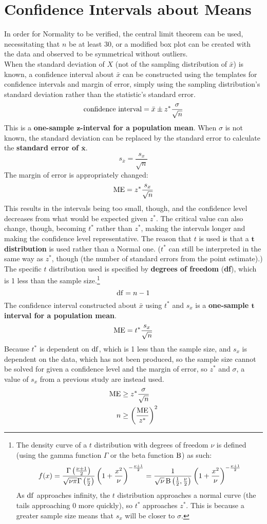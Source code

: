 \documentclass[../AP_Statistics.tex]{subfiles}
\begin{document}
		\section{Confidence Intervals about Means}
			In order for Normality to be verified, the central limit theorem can be used, necessitating that $n$ be at least 30, or a modified box plot can be created with the data and observed to be symmetrical without outliers. \\
			When the standard deviation of $X$ (not of the sampling distribution of $\bar{x}$) is known, a confidence interval about $\bar{x}$ can be constructed using the templates for confidence intervals and margin of error, simply using the sampling distribution's standard deviation rather than the statistic's standard error.
			\[\text{confidence interval} = \bar{x} \pm z^*\frac{\sigma}{\sqrt{n}}\]
			This is a \textbf{one-sample $\bm{z}$-interval for a population mean}.
			When $\sigma$ is not known, the standard deviation can be replaced by the standard error to calculate the \textbf{standard error of $\bm{\bar{x}}$}.
			\[s_{\bar{x}} = \frac{s_x}{\sqrt{n}}\]
			The margin of error is appropriately changed:
			\[\operatorname{ME} = z^*\frac{s_x}{\sqrt{n}}\]
			This results in the intervals being too small, though, and the confidence level decreases from what would be expected given $z^*$. The critical value can also change, though, becoming $t^*$ rather than $z^*$, making the intervals longer and making the confidence level representative. The reason that $t$ is used is that a $\bm{t}$\textbf{ distribution} is used rather than a Normal one. ($t^*$ can still be interpreted in the same way as $z^*$, though (the number of standard errors from the point estimate).) \\
			The specific $t$ distribution used is specified by \textbf{degrees of freedom} (\textbf{df}), which  is 1 less than the sample size.\footnote{The density curve of a $t$ distribution with degrees of freedom $\nu$ is defined (using the gamma function $\Gamma$ or the beta function $\operatorname{\mathrm{B}}$) as such:\[f(x) = \frac{\Gamma\left(\frac{\nu + 1}{2}\right)}{\sqrt{\nu\pi}\Gamma\left(\frac{\nu}{2}\right)}\left(1 + \frac{x^2}{\nu}\right)^{-\frac{\nu + 1}{2}} = \frac{1}{\sqrt{\nu}\operatorname{\mathrm{B}}\left(\frac{1}{2},\frac{\nu}{2}\right)}\left(1 + \frac{x^2}{\nu}\right)^{-\frac{\nu + 1}{2}}\]As $\operatorname{\mathrm{df}}$ approaches infinity, the $t$ distribution approaches a normal curve (the tails approaching 0 more quickly), so $t^*$ approaches $z^*$. This is because a greater sample size means that $s_x$ will be closer to $\sigma$.} \\
			\[\operatorname{\mathrm{df}} = n - 1\]
			The confidence interval constructed about $\bar{x}$ using $t^*$ and $s_x$ is a \textbf{one-sample $\bm{t}$ interval for a population mean}.
			\[\operatorname{ME} = t^*\frac{s_x}{\sqrt{n}}\]
			Because $t^*$ is dependent on $\operatorname{\mathrm{df}}$, which is 1 less than the sample size, and $s_x$ is dependent on the data, which has not been produced, so the sample size cannot be solved for given a confidence level and the margin of error, so $z^*$ and $\sigma$, a value of $s_x$ from a previous study are instead used.
			\begin{align*}
				\operatorname{ME} &\ge z^*\frac{\sigma}{\sqrt{n}} \\
				n &\ge \left(\frac{\operatorname{ME}}{z^*}\right)^2
			\end{align*}
\end{document}
